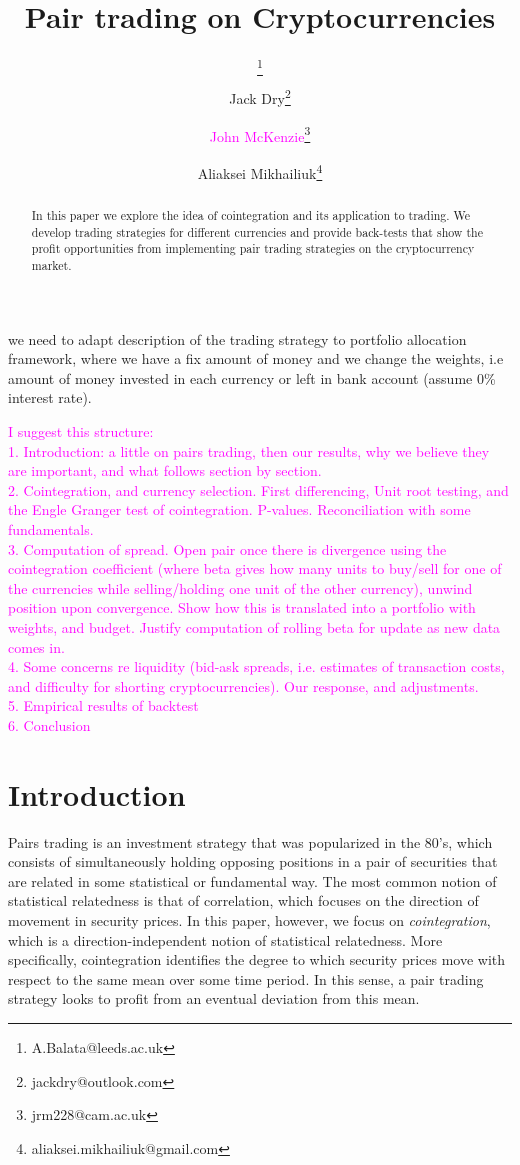 \documentclass[a4paper,11pt]{article}
\title{Pair trading on Cryptocurrencies}
\author{\ab{Alessandro Balata}\thanks{A.Balata@leeds.ac.uk} }
\author{Jack Dry\thanks{jack\textunderscore dry@outlook.com}}
\author{\textcolor{magenta}{John McKenzie}\thanks{jrm228@cam.ac.uk}}
\author{Aliaksei Mikhailiuk\thanks{aliaksei.mikhailiuk@gmail.com}}
\affil{The Quant Group - \textit{www.thequantgroup.org} -}
\theoremstyle{remark}
\theoremstyle{plain}
\newcommand\ab[1]{{\color{blue} #1 }}
\begin{document}
\maketitle

\begin{abstract}
In this paper we explore the idea of cointegration and its application to trading. We develop trading strategies for different currencies and provide back-tests that show the profit opportunities from implementing pair trading strategies on the cryptocurrency market.
\end{abstract}

\ab{we need to adapt description of the trading strategy to portfolio allocation framework, where we have a fix amount of money and we change the weights, i.e amount of money invested in each currency or left in bank account (assume 0\% interest rate).}

\textcolor{magenta}{I suggest this structure:\\
1.	Introduction: a little on pairs trading, then our results, why we believe they are important, and what follows section by section.\\
2.	Cointegration, and currency selection. First differencing, Unit root testing, and the Engle Granger test of cointegration. P-values. Reconciliation with some fundamentals.\\
3.	Computation of spread. Open pair once there is divergence using the cointegration coefficient (where beta gives how many units to buy/sell for one of the currencies while selling/holding one unit of the other currency), unwind position upon convergence. Show how this is translated into a portfolio with weights, and budget. Justify computation of rolling beta for update as new data comes in.\\
4.	Some concerns re liquidity (bid-ask spreads, i.e. estimates of transaction costs, and difficulty for shorting cryptocurrencies). Our response, and adjustments.\\
5.	Empirical results of backtest\\
6.	Conclusion\\}

\newpage


\section{Introduction}

Pairs trading is an investment strategy that was popularized in the 80's, which consists of simultaneously holding opposing positions in a pair of securities that are related in some statistical or fundamental way. The most common notion of statistical relatedness is that of correlation, which focuses on the direction of movement in security prices. In this paper, however, we focus on \textit{cointegration}, which is a direction-independent notion of statistical relatedness. More specifically, cointegration identifies the degree to which security prices move with respect to the same mean over some time period. In this sense, a pair trading strategy looks to profit from an eventual deviation from this mean.\\
\end{document}

